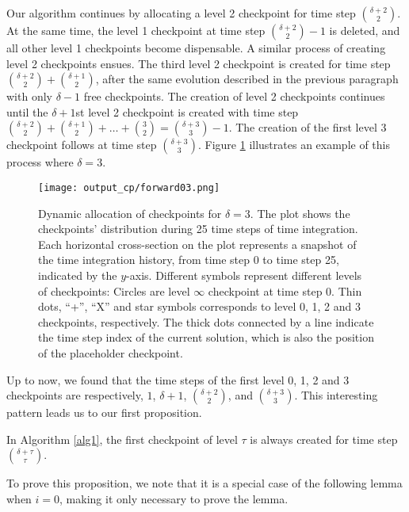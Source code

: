 Our algorithm continues by allocating a level 2 checkpoint for time step
$\binom{\delta + 2}{2}$.  At the same time, the level 1 checkpoint at time
step $\binom{\delta + 2}{2} - 1$ is deleted, and all other
level 1 checkpoints become dispensable.  A similar process of creating
level 2 checkpoints ensues.  The third level 2 checkpoint is
created for time step $\binom{\delta + 2}{2} + \binom{\delta + 1}{2}$, after
the same evolution described in the previous paragraph with only $\delta - 1$
free checkpoints.  The creation of level 2 checkpoints continues until the
$\delta + 1$st level 2 checkpoint is created with time step
$\binom{\delta + 2}{2} + \binom{\delta + 1}{2} + \ldots + \binom{3}{2} = 
\binom{\delta + 3}{3} - 1$.  The creation of the  first level 3 checkpoint
follows at time step $\binom{\delta + 3}{3}$.  Figure \ref{fig0} illustrates
an example of this process where $\delta = 3$.
\begin{figure}[htb!] \center
    \texttt{[image: output\_cp/forward03.png]}
    \caption{Dynamic allocation of checkpoints for $\delta = 3$.  The plot
    shows the checkpoints' distribution during 25 time steps of time
    integration.  Each horizontal cross-section on the plot represents a
    snapshot of the time integration history, from time step 0 to time step 25,
    indicated by the $y$-axis.  Different symbols represent different levels of
    checkpoints:  Circles are level $\infty$ checkpoint at time step 0.
    Thin dots, ``+'', ``X'' and star symbols corresponds to level 0, 1, 2 and 3
    checkpoints, respectively.  The thick dots connected by a line indicate the
    time step index of the current solution, which is also the position of the
    placeholder checkpoint.} \label{fig0}
\end{figure}
Up to now, we found that the
time steps of the first level 0, 1, 2 and 3 checkpoints are respectively, $1$,
$\delta + 1$, $\binom{\delta + 2}{2}$, and $\binom{\delta + 3}{3}$.  This
interesting pattern leads us to our first proposition.

\begin{proposition} \label{thm1}
    In Algorithm \ref{alg1}, the first checkpoint of level $\tau$ is always
    created for time step $\binom{\delta + \tau}{\tau}$.
\end{proposition}

To prove this proposition, we note that it is a special case of the following
lemma when $i = 0$, making it only necessary to prove the lemma.

